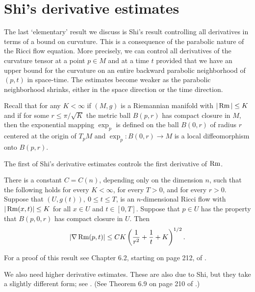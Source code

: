 \section{Shi's derivative estimates}

The last `elementary' result we discuss is Shi's result controlling all derivatives in terms of a
bound on curvature. This is a consequence of the parabolic nature of
the Ricci flow equation. More precisely, we can control all
derivatives of the curvature tensor at a point $p\in M$ and at a
time $t$ provided that we have an upper bound for the curvature on
an entire backward parabolic neighborhood of $(p,t)$ in space-time.
The estimates become weaker as the parabolic neighborhood shrinks,
either in the space direction or the time direction.

Recall that for any $K<\infty$  if $(M,g)$ is a Riemannian manifold
with $|\operatorname{Rm}|\le K$ and if for some $r\le \pi/\sqrt{K}$ the metric ball
$B(p,r)$ has compact closure in $M$, then the exponential mapping
$\exp_p$ is defined on the ball $B(0,r)$ of radius $r$ centered
at the origin of $T_pM$ and $\exp_p\colon B(0,r)\to M$ is a
local diffeomorphism onto $B(p,r)$.


The first of Shi's derivative estimates controls the first
derivative of $\operatorname{Rm}$.

\begin{theorem}\label{thm:shi-first-derivative}

\label{firstshi}

There is a constant $C=C(n)$, depending only on the dimension $n$,
such that the following holds for every $K<\infty$, for every $T>0$,
and for every $r>0$. Suppose that $(U,g(t)),\ 0\le t\le T$, is an $n$-dimensional
Ricci flow with $|\operatorname{Rm}(x,t)|\le K$ for all $x\in U$ and $t\in [0,T]$.
Suppose that $p\in U$ has the property that $B(p,0,r)$ has compact
closure in $U$. Then
$$|\nabla \operatorname{Rm}(p,t)|\le
CK\left(\frac{1}{r^2}+\frac{1}{t}+K\right)^{1/2}.$$
\end{theorem}


For a proof of this result see Chapter 6.2, starting on page 212, of
\cite{ChowLuNi}.

We also need higher derivative estimates. These are also due to Shi,
but they take a slightly different form; see \cite{Shi1,Shi2}. (See Theorem 6.9 on page
210 of \cite{ChowLuNi}.)


